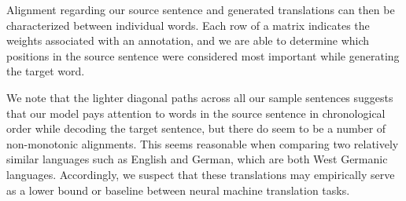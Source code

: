\documentclass[11pt]{article}
\begin{document}
Alignment regarding our source sentence and generated translations can then be characterized between individual words. Each row of a matrix indicates the weights associated with an annotation, and we are able to determine which positions in the source sentence were considered most important while generating the target word.

We note that the lighter diagonal paths across all our sample sentences suggests that our model pays attention to words in the source sentence in chronological order while decoding the target sentence, but there do seem to be a number of non-monotonic alignments. This seems reasonable when comparing two relatively similar languages such as English and German, which are both West Germanic languages. Accordingly, we suspect that these translations may empirically serve as a lower bound or baseline between neural machine translation tasks.





\end{document}
